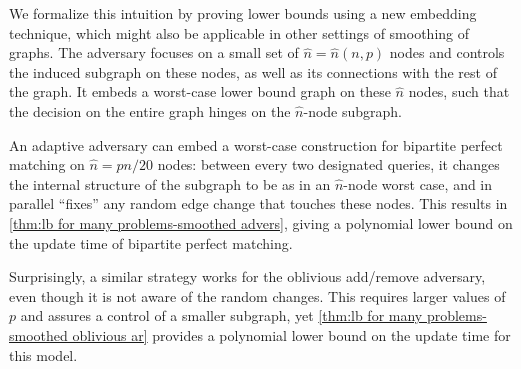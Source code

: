 \documentclass[letter,11pt]{article}
\begin{document}
We formalize this intuition by proving lower bounds using a new embedding technique, which might also be applicable in other settings of smoothing of graphs.
The adversary focuses on a small set of $\hat n = \hat n(n,p)$ nodes and controls the induced subgraph on these nodes, as well as its connections with the rest of the graph.
It embeds a worst-case lower bound graph on these $\hat n$ nodes,
such that the decision on the entire graph hinges on the $\hat n$-node subgraph.

An adaptive adversary can embed a worst-case construction for bipartite perfect matching on $\hat n =pn/20$ nodes: 
between every two designated queries, it changes the internal structure of the subgraph to be as in an $\hat n$-node worst case, and in parallel ``fixes'' any random edge change that touches these nodes.
This results in \cref{thm:lb for many problems-smoothed advers}, giving a polynomial lower bound on the update time of bipartite perfect matching.

Surprisingly, a similar strategy works for the oblivious add/remove adversary,
even though it is not aware of the random changes.
This requires larger values of $p$ and assures a control of a smaller subgraph, yet \cref{thm:lb for many problems-smoothed oblivious ar} provides a polynomial lower bound on the update time for this model.
\end{document}
